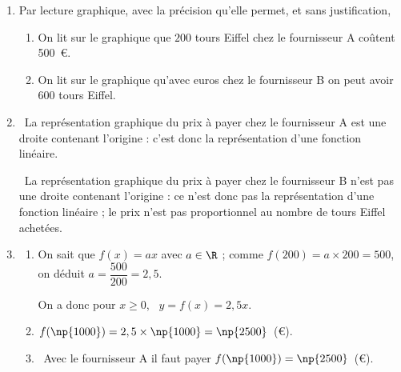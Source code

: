 \begin{enumerate}
\item Par lecture graphique, avec la précision qu'elle permet, et sans justification,
	\begin{enumerate}
		\item %
On lit sur le graphique que $200$ tours Eiffel chez le fournisseur A coûtent 500~\euro.
		\item %
On lit sur le graphique qu'avec  euros chez le fournisseur B on peut avoir 600 tours Eiffel.
	\end{enumerate}
\item %
\starredbullet~La représentation graphique du prix à payer chez le fournisseur A est une droite contenant l'origine : c'est donc la représentation d'une fonction linéaire.

\starredbullet~La représentation graphique du prix à payer chez le fournisseur B n'est pas une droite contenant l'origine : ce n'est donc pas la représentation d'une fonction linéaire ; le prix n'est pas proportionnel au nombre de tours Eiffel achetées.
\item 
	\begin{enumerate}
		\item %
		
On sait que $f(x) = ax$ avec $a \in \R$ ; comme $f(200) = a \times 200 = 500$, on déduit $a = \dfrac{500}{200} = 2,5$.

On a donc pour $x \geqslant 0$, \, $y = f(x) = 2,5x$.
		\item %
$f(\np{1000}) = 2,5 \times \np{1000} = \np{2500}$~(\euro).
		\item %
\starredbullet~Avec le fournisseur A il faut payer 	$f(\np{1000}) = \np{2500}$~(\euro).


\end{enumerate}
\end{enumerate}
